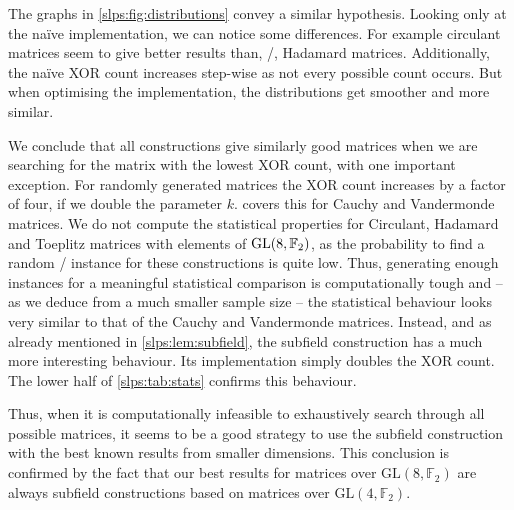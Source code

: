 The graphs in \cref{slps:fig:distributions} convey a similar hypothesis.
Looking only at the na\"ive implementation, we can notice some differences.
For example circulant matrices seem to give better results than, \eg/, Hadamard matrices.
Additionally, the na\"ive XOR count increases step-wise as not every possible count occurs.
But when optimising the implementation, the distributions get smoother and more similar.

We conclude that all constructions give similarly good matrices when we are searching for the matrix with the lowest XOR count, with one important exception.
For randomly generated matrices the XOR count increases by a factor of four, if we double the parameter $k$.
 covers this for Cauchy and Vandermonde matrices.
We do not compute the statistical properties for Circulant, Hadamard and Toeplitz matrices with elements of $\mathrm{GL}(8, \mathbb{F}_2)$, as the probability to find a random \MDS/ instance for these constructions is quite low.
Thus, generating enough instances for a meaningful statistical comparison is computationally tough and -- as we deduce from a much smaller sample size -- the statistical behaviour looks very similar to that of the Cauchy and Vandermonde matrices.
Instead, and as already mentioned in \cref{slps:lem:subfield}, the subfield construction has a much more interesting behaviour.
Its implementation simply doubles the XOR count.
The lower half of \cref{slps:tab:stats} confirms this behaviour.

Thus, when it is computationally infeasible to exhaustively search through all possible matrices, it seems to be a good strategy to use the subfield construction with the best known results from smaller dimensions.
This conclusion is confirmed by the fact that our best results for matrices over $\mathrm{GL}(8, \mathbb{F}_2)$ are always subfield constructions based on matrices over $\mathrm{GL}(4, \mathbb{F}_2)$.

